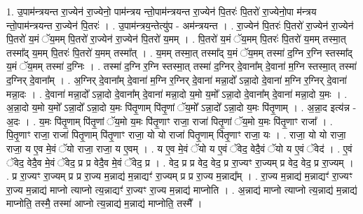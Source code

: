 \documentclass[17pt]{extarticle}
\begin{document}
1. उ॒पाम॑न्त्रयन्त रा॒ज्येन॑ रा॒ज्येनो॒ पाम॑न्त्रय न्तो॒पाम॑न्त्रयन्त रा॒ज्येन॑ पि॒तरः॑ पि॒तरो॑ रा॒ज्येनो॒पा 
म॑न्त्रय न्तो॒पाम॑न्त्रयन्त रा॒ज्येन॑ पि॒तरः॑ । . उ॒पाम॑न्त्रय॒न्तेत्यु॑प - अम॑न्त्रयन्त । . रा॒ज्येन॑ पि॒तरः॑ पि॒तरो॑ रा॒ज्येन॑ रा॒ज्येन॑ पि॒तरो॑ य॒मं ॅय॒मम् पि॒तरो॑ रा॒ज्येन॑ रा॒ज्येन॑ पि॒तरो॑ य॒मम् । . पि॒तरो॑ य॒मं ॅय॒मम् पि॒तरः॑ पि॒तरो॑ य॒मम् तस्मा॒त् तस्मा᳚द् य॒मम् पि॒तरः॑ पि॒तरो॑ य॒मम् तस्मा᳚त् । . य॒मम् तस्मा॒त् तस्मा᳚द् य॒मं ॅय॒मम् तस्मा॑ द॒ग्नि र॒ग्नि स्तस्मा᳚द् य॒मं ॅय॒मम् तस्मा॑ द॒ग्निः । . तस्मा॑ द॒ग्नि र॒ग्नि स्तस्मा॒त् तस्मा॑ द॒ग्निर् दे॒वाना᳚म् दे॒वाना॑ म॒ग्नि स्तस्मा॒त् तस्मा॑ द॒ग्निर् दे॒वाना᳚म् । . अ॒ग्निर् दे॒वाना᳚म् दे॒वाना॑ म॒ग्नि र॒ग्निर् दे॒वाना॑ मन्ना॒दो᳚ ऽन्ना॒दो दे॒वाना॑ म॒ग्नि र॒ग्निर् दे॒वाना॑ मन्ना॒दः । . दे॒वाना॑ मन्ना॒दो᳚ ऽन्ना॒दो दे॒वाना᳚म् दे॒वाना॑ मन्ना॒दो य॒मो य॒मो᳚ ऽन्ना॒दो दे॒वाना᳚म् दे॒वाना॑ मन्ना॒दो य॒मः । . अ॒न्ना॒दो य॒मो य॒मो᳚ ऽन्ना॒दो᳚ ऽन्ना॒दो य॒मः पि॑तृ॒णाम् पि॑तृ॒णां ॅय॒मो᳚ ऽन्ना॒दो᳚ ऽन्ना॒दो य॒मः पि॑तृ॒णाम् । . अ॒न्ना॒द इत्य॑न्न - अ॒दः । . य॒मः पि॑तृ॒णाम् पि॑तृ॒णां ॅय॒मो य॒मः पि॑तृ॒णाꣳ राजा॒ राजा॑ पितृ॒णां ॅय॒मो य॒मः पि॑तृ॒णाꣳ राजा᳚ । . पि॒तृ॒णाꣳ राजा॒ राजा॑ पितृ॒णाम् पि॑तृ॒णाꣳ राजा॒ यो यो राजा॑ पितृ॒णाम् पि॑तृ॒णाꣳ राजा॒ यः । . राजा॒ यो यो राजा॒ राजा॒ य ए॒व मे॒वं ॅयो राजा॒ राजा॒ य ए॒वम् । . य ए॒व मे॒वं ॅयो य ए॒वं ॅवेद॒ वेदै॒वं ॅयो य ए॒वं ॅवेद॑ । . ए॒वं ॅवेद॒ वेदै॒व मे॒वं ॅवेद॒ प्र प्र वेदै॒व मे॒वं ॅवेद॒ प्र । . वेद॒ प्र प्र वेद॒ वेद॒ प्र रा॒ज्यꣳ रा॒ज्यम् प्र वेद॒ वेद॒ प्र रा॒ज्यम् । . प्र रा॒ज्यꣳ रा॒ज्यम् प्र प्र रा॒ज्य म॒न्नाद्य॑ म॒न्नाद्यꣳ॑ रा॒ज्यम् प्र प्र रा॒ज्य म॒न्नाद्य᳚म् । . रा॒ज्य म॒न्नाद्य॑ म॒न्नाद्यꣳ॑ रा॒ज्यꣳ रा॒ज्य म॒न्नाद्य॑ माप्नो त्याप्नो त्य॒न्नाद्यꣳ॑ रा॒ज्यꣳ रा॒ज्य म॒न्नाद्य॑ माप्नोति । . अ॒न्नाद्य॑ माप्नो त्याप्नो त्य॒न्नाद्य॑ म॒न्नाद्य॑ माप्नोति॒ तस्मै॒ तस्मा॑ आप्नो त्य॒न्नाद्य॑ म॒न्नाद्य॑ माप्नोति॒ तस्मै᳚ । \newline
\end{document}
